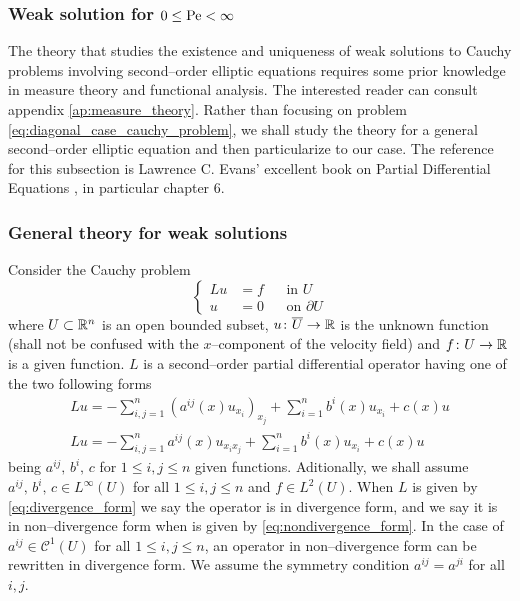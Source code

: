 
\subsubsection{Weak solution for \texorpdfstring{$0 \leq \mathrm{Pe} <
\infty$}{finite Péclet's number}}

The theory that studies the existence and uniqueness of weak solutions to Cauchy
problems involving second--order elliptic equations requires some prior
knowledge in measure theory and functional analysis. The interested reader can
consult appendix \ref{ap:measure_theory}. Rather than focusing on problem
\eqref{eq:diagonal_case_cauchy_problem}, we shall study the theory for a general
second--order elliptic equation and then particularize to our case. The
reference for this subsection is Lawrence C. Evans' excellent book on Partial
Differential Equations \cite{evans1998pde}, in particular chapter 6.

\subsubsection*{General theory for weak solutions}

Consider the Cauchy problem
\begin{equation} \label{eq:second_order_elliptic_problem}
	\left\{
		\begin{aligned}
			L u &= f & &\text{in } U \\
			u &= 0 & &\text{on } \partial U
		\end{aligned}
	\right.
\end{equation}
where $U \subset \mathbb{R}^n$ is an open bounded subset, $u \colon \overline{U}
\rightarrow \mathbb{R}$ is the unknown function (shall not be confused with the
$x$--component of the velocity field) and $f \colon U \rightarrow \mathbb{R}$ is a
given function. $L$ is a second--order partial differential operator having one
of the two following forms
\begin{gather}
	L u = - \sum_{i,j=1}^n (a^{ij}(x) u_{x_i})_{x_j} + \sum_{i=1}^n b^i(x) u_{x_i} + c(x) u \label{eq:divergence_form}\\
	L u = - \sum_{i,j=1}^n a^{ij}(x) u_{x_i x_j} + \sum_{i=1}^n b^i(x) u_{x_i} + c(x) u	
	\label{eq:nondivergence_form}
\end{gather}
being $a^{ij}, \, b^i, \, c$ for $1 \leq i, j \leq n$ given functions.
Aditionally, we shall assume $a^{ij}, \, b^i, \, c \in L^\infty(U)$ for all $1
\leq i, j \leq n$ and $f \in L^2(U)$. When $L$ is given by
\eqref{eq:divergence_form} we say the operator is in divergence form, and we say
it is in non--divergence form when is given by \eqref{eq:nondivergence_form}. In
the case of $a^{ij} \in \mathcal{C}^1(U)$ for all $1 \leq i, j \leq n$, an
operator in non--divergence form can be rewritten in divergence form. We assume
the symmetry condition $a^{ij} = a^{ji}$ for all $i, j$.

